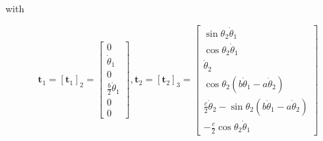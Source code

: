 \documentclass[conference]{IEEEtran}
\begin{document}
with
\begin{small}
    $$
        \mathbf{t}_1=\left[\mathbf{t}_1\right]_2=\left[\begin{array}{c}
                0                          \\
                \dot{\theta}_1             \\
                0                          \\
                \frac{b}{2} \dot{\theta}_1 \\
                0                          \\
                0
            \end{array}\right], \mathbf{t}_2=\left[\mathbf{t}_2\right]_3=\left[\begin{array}{c}
                \sin \theta_2 \dot{\theta}_1                                                           \\
                \cos \theta_2 \dot{\theta}_1                                                           \\
                \dot{\theta}_2                                                                         \\
                \cos \theta_2\left(b \dot{\theta}_1-a \dot{\theta}_2\right)                            \\
                \frac{c}{2} \dot{\theta}_2-\sin \theta_2\left(b \dot{\theta}_1-a \dot{\theta}_2\right) \\
                -\frac{c}{2} \cos \theta_2 \dot{\theta}_1
            \end{array}\right]
    $$
\end{small}
\end{document}
